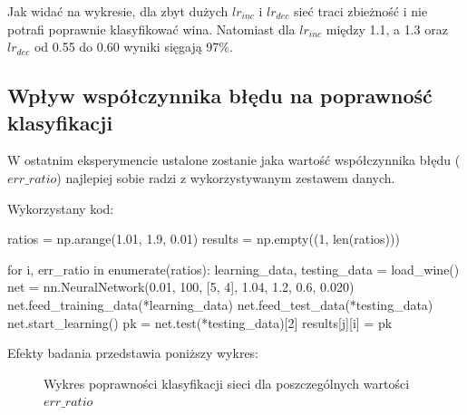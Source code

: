 \documentclass[a4paper,12pt]{article}
\numberwithin{equation}{section}
\begin{document}
Jak widać na wykresie, dla zbyt dużych $lr_{inc}$ i $lr_{dec}$ sieć traci zbieżność i nie potrafi poprawnie klasyfikować wina. Natomiast dla $lr_{inc}$ między 1.1, a 1.3 oraz $lr_{dec}$ od 0.55 do 0.60 wyniki sięgają 97\%.


\subsection{Wpływ współczynnika błędu na poprawność klasyfikacji}

W ostatnim eksperymencie ustalone zostanie jaka wartość współczynnika błędu ($err\_ratio$) najlepiej sobie radzi z wykorzystywanym zestawem danych.

\noindent Wykorzystany kod:
\begin{pythoncode}
ratios = np.arange(1.01, 1.9, 0.01)
results = np.empty((1, len(ratios)))

for i, err_ratio in enumerate(ratios):
    learning_data, testing_data = load_wine()
    net = nn.NeuralNetwork(0.01, 100, [5, 4], 1.04, 1.2, 0.6, 0.020)
    net.feed_training_data(*learning_data)
    net.feed_test_data(*testing_data)
    net.start_learning()
    pk = net.test(*testing_data)[2]
    results[j][i] = pk
\end{pythoncode}

\noindent Efekty badania przedstawia poniższy wykres:
\begin{figure}[h]
    \centering
    
    \vspace{1cm}

    \caption{Wykres poprawności klasyfikacji sieci dla poszczególnych wartości $err\_ratio$}
    \label{fig:exp_5}
\end{figure}
\end{document}
